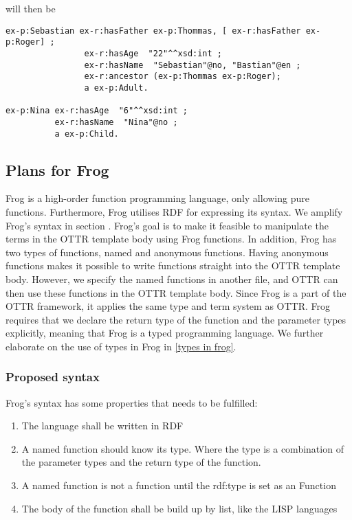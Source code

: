 will then be
\begin{lstlisting}[frame=single, language=turtle]
ex-p:Sebastian ex-r:hasFather ex-p:Thommas, [ ex-r:hasFather ex-p:Roger] ; 
                ex-r:hasAge  "22"^^xsd:int ; 
                ex-r:hasName  "Sebastian"@no, "Bastian"@en ;
                ex-r:ancestor (ex-p:Thommas ex-p:Roger);
                a ex-p:Adult.

ex-p:Nina ex-r:hasAge  "6"^^xsd:int ; 
          ex-r:hasName  "Nina"@no ;
          a ex-p:Child.
\end{lstlisting}

\subsection{Plans for Frog}
Frog is a high-order function programming language, only allowing pure functions. Furthermore, Frog utilises RDF for expressing its syntax. We amplify Frog's syntax in section \label{frog syntax}. Frog's goal is to make it feasible to manipulate the terms in the OTTR template body using Frog functions. In addition, Frog has two types of functions, named and anonymous functions. Having anonymous functions makes it possible to write functions straight into the OTTR template body. However, we specify the named functions in another file, and OTTR can then use these functions in the OTTR template body. Since Frog is a part of the OTTR framework, it applies the same type and term system as OTTR. Frog requires that we declare the return type of the function and the parameter types explicitly, meaning that Frog is a typed programming language. We further elaborate on the use of types in Frog in \autoref{types in frog}.

\subsubsection{Proposed syntax}
\label{frog syntax}
Frog's syntax has some properties that needs to be fulfilled: 
\begin{enumerate}
    \item The language shall be written in RDF 
    \item A named function should know its type. Where the type is a combination of the parameter types 
    and the return type of the function.
    \item A named function is not a function until the rdf:type is set as an Function
    \item The body of the function shall be build up by list, like the LISP languages
\end{enumerate}


